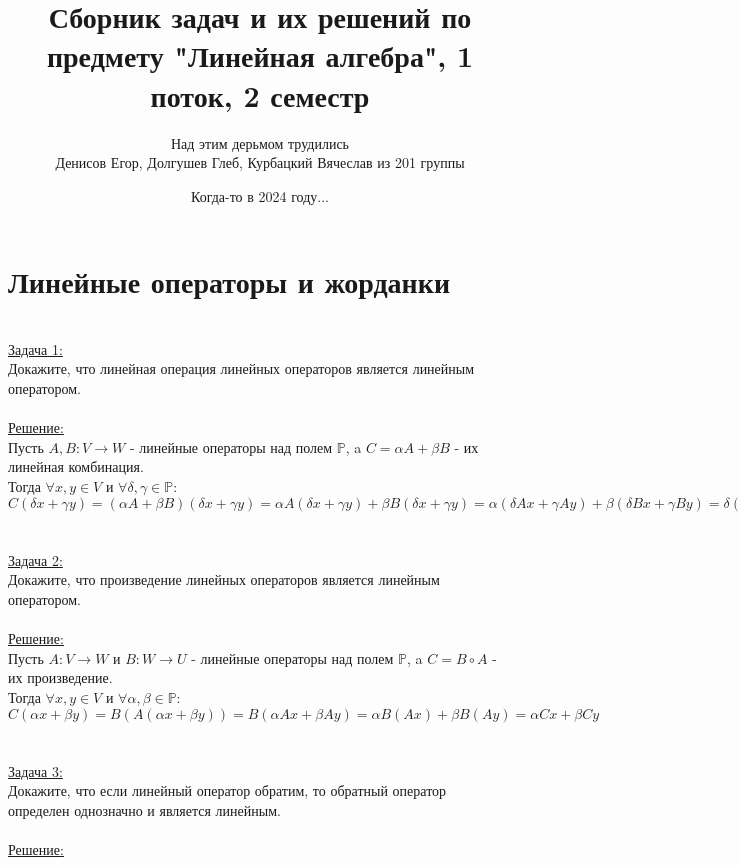 \documentclass[a4paper,12pt,titlepage,final]{article}
\title{Сборник задач и их решений по предмету "Линейная алгебра", 1 поток, 2 семестр}
\author{ Над этим дерьмом трудились\\Денисов Егор, Долгушев Глеб, Курбацкий Вячеслав из 201 группы}
\date{Когда-то в 2024 году...}
\begin{document}
\maketitle

\newpage
\tableofcontents

\newpage
\section{Линейные операторы и жорданки}\\

\noindent \underline{Задача 1:} \\
Докажите, что линейная операция линейных операторов является линейным оператором. \\ \\
\underline{Решение:} \\
Пусть $A, B: V \rightarrow W$ - линейные операторы над полем $\mathbb{P}$, a $C = \alpha A + \beta B$ - их линейная комбинация.\\
Тогда $\forall x, y \in V$ и $\forall \delta, \gamma \in \mathbb{P}$:
$C(\delta x + \gamma y) = (\alpha A + \beta B) (\delta x + \gamma y) = \alpha A(\delta x + \gamma y) + \beta B(\delta x + \gamma y) =
\alpha (\delta Ax + \gamma Ay) + \beta (\delta Bx + \gamma By) = \delta (\alpha Ax + \beta Bx) + \gamma (\alpha Ay + \beta By) =
\delta (\alpha A + \beta B)x + \gamma (\alpha A + \beta B)y = \delta Cx + \gamma Cy$ \\ \\ \\

\noindent \underline{Задача 2:} \\
Докажите, что произведение линейных операторов является линейным оператором. \\ \\
\underline{Решение:} \\
Пусть $A: V \rightarrow W$ и $B: W \rightarrow U$ - линейные операторы над полем $\mathbb{P}$, a $C = B \circ A$ - их произведение.\\
Тогда $\forall x, y \in V$ и $\forall \alpha, \beta \in \mathbb{P}$:
$C(\alpha x + \beta y) = B(A(\alpha x + \beta y)) = B(\alpha Ax + \beta Ay) = \alpha B(Ax) + \beta B(Ay) = \alpha Cx + \beta Cy$ \\ \\ \\

\noindent \underline{Задача 3:} \\
Докажите, что если линейный оператор обратим, то обратный оператор определен однозначно и является линейным. \\ \\
\underline{Решение:} \\
\end{document}
